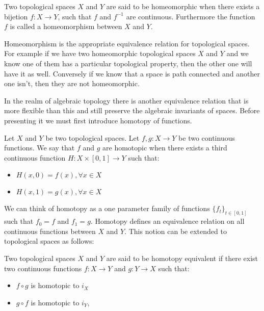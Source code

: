 \begin{defn} Two topological spaces $X$ and $Y$ are said to be homeomorphic when there exists a bijetion $f : X \to Y$, such that $f$ and $f^{-1}$ are continuous. Furthermore the function $f$ is called a homeomorphism between $X$ and $Y$.  \end{defn}

Homeomorphism is the appropriate equivalence relation for topological spaces. For example if we have two homeomorphic topological spaces $X$ and $Y$ and we know one of them has a particular topological property, then the other one will have it as well. Conversely if we know that a space is path connected and another one isn't, then they are not homeomorphic.

In the realm of algebraic topology there is another equivalence relation that is more flexible than this and still preserve the algebraic invariants of spaces. Before presenting it we must first introduce homotopy of functions.


\begin{defn} Let $X$ and $Y$ be two topological spaces. Let $f, g: X \to Y$ be two continuous functions. We say that $f$ and $g$ are homotopic when there exists a third continuous function $H:X \times [0, 1] \to Y$ such that:  \end{defn}

\begin{itemize}
    \item $H(x, 0) = f(x), \forall x\in X$
    \item $H(x, 1) = g(x), \forall x\in X$
\end{itemize}

We can think of homotopy as a one parameter family of functions $\{f_t\}_{t \in [0, 1]}$ such that $f_0 = f$ and $f_1 = g$. Homotopy defines an equivalence relation on all continuous functions between $X$ and $Y$. This notion can be extended to topological spaces as follows:


\begin{defn} Two topological spaces $X$ and $Y$ are said to be homotopy equivalent if there exist two continuous functions $f: X \to Y$ and $g: Y \to X$ such that:  \end{defn}
\begin{itemize}
    \item $f \circ g$ is homotopic to $i_X$ 
    \item $g \circ f$ is homotopic to $i_Y$,
\end{itemize}

